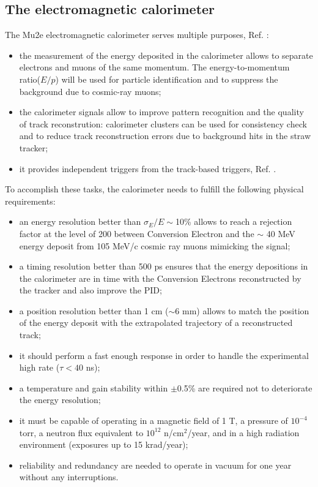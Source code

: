 \subsection{The electromagnetic calorimeter}\label{calorimeter}
The Mu2e electromagnetic calorimeter serves multiple purposes, Ref. \cite{em4}:
\begin{itemize}
    \item the measurement of the energy deposited in the calorimeter 
    allows to separate electrons and muons of the same momentum. 
    The energy-to-momentum ratio($E/p$) will be used for particle 
    identification and to suppress the background due to cosmic-ray muons;
    \item the calorimeter signals allow to improve pattern recognition and 
    the quality of track reconstrution: calorimeter clusters can be used 
    for consistency check and to reduce track reconstruction 
    errors due to background hits in the straw tracker;
    \item it provides independent triggers from the track-based triggers, Ref. \cite{em6}. 
\end{itemize} 
To accomplish these tasks, the calorimeter needs to fulfill 
the following physical requirements:
\begin{itemize}
    \item an energy resolution better than $\sigma_E/E \sim$10\% allows
     to reach a rejection factor at the level of 200 between Conversion Electron
    and the $\sim$ 40 MeV energy deposit from 105 MeV/c cosmic ray muons mimicking the signal;
    \item a timing resolution better than 500 ps ensures that
    the energy depositions in the calorimeter are in time with
    the Conversion Electrons reconstructed by the tracker and
    also improve the PID;
    \item a position resolution better than 1 cm ($\sim$6 mm) allows 
    to match the position of the energy deposit with the 
    extrapolated trajectory of a reconstructed track;
    \item it should perform a fast enough 
    response in order to handle the experimental high rate ($\tau < 40$ ns);
    \item a temperature and gain stability within $\pm$0.5\% 
    are required not to deteriorate the energy resolution;
    \item it must be capable of operating in 
    a magnetic field of 1 T, a pressure of \(10^{-4}\) torr, a 
    neutron flux equivalent to \(10^{12}\) n/cm\(^2\)/year, 
    and in a high radiation environment (exposures up to 15 krad/year);
    \item reliability and redundancy are needed to operate in vacuum for one
    year without any interruptions.
\end{itemize}


